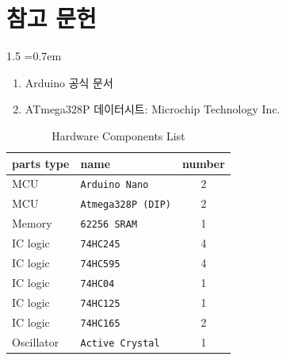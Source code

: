\documentclass[a4paper, 12pt]{article}
\begin{document}
\section{참고 문헌}
\begin{spacing}{1.5}
\font=0.7em
\begin{enumerate}
    \item Arduino 공식 문서
    \item ATmega328P 데이터시트: Microchip Technology Inc.
\end{enumerate}
\end{spacing}


\begin{table}[H] %
    \centering
    \caption{Hardware Components List}
    \vspace{0.8em}
    
    \begin{tabularx}{\textwidth}{l X c}
        \toprule
        \textbf{parts type} & \textbf{name} & \textbf{number} \\
        \midrule
        MCU & \texttt{Arduino Nano} & 2 \\
        MCU & \texttt{Atmega328P (DIP)} & 2 \\
        Memory & \texttt{62256 SRAM} & 1 \\
        \addlinespace
        IC logic & \texttt{74HC245} & 4 \\
        IC logic & \texttt{74HC595} & 4 \\
        IC logic & \texttt{74HC04} & 1 \\
        IC logic & \texttt{74HC125} & 1 \\
        IC logic & \texttt{74HC165} & 2 \\
        \addlinespace
        Oscillator & \texttt{Active Crystal} & 1 \\
        \bottomrule
    \end{tabularx}
\end{table}
\end{document}
